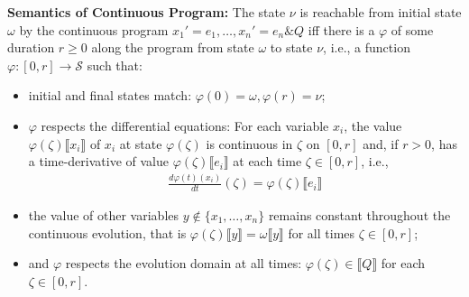 \textbf{Semantics of Continuous Program:}
The state $\nu$ is reachable from initial state $\omega$ 
by the continuous program $x_1' = e_1, \dots, x_n' = e_n \& Q$
iff there is a  $\varphi$ of some duration $r \geq 0$
along the program from state $\omega$ to state $\nu$, i.e., 
a function $\varphi:[0, r] \rightarrow \mathscr{S}$ such that:
\vspace{-.5cm}
\begin{itemize}
  \item initial and final states match: $\varphi(0) = \omega, \varphi(r) = \nu$;
  \item $\varphi$ respects the differential equations: For each variable $x_i$, 
    the value $\varphi(\zeta)\llbracket x_i \rrbracket$ of $x_i$ at 
    state $\varphi(\zeta)$ is continuous in $\zeta$ on $[0, r]$ and,
    if $r > 0$, has a time-derivative of value 
    $\varphi(\zeta)\llbracket e_i \rrbracket$ at each time $\zeta \in [0, r]$, 
    i.e.,
    \begin{align*}
      \frac{d\varphi(t)(x_i)}{dt}(\zeta) = \varphi(\zeta)\llbracket e_i \rrbracket
    \end{align*}
  \item the value of other variables $y \notin \{x_1, \dots, x_n\}$ remains 
    constant throughout the continuous evolution, that is 
    $\varphi(\zeta)\llbracket y \rrbracket = \omega\llbracket y \rrbracket$ 
    for all times $\zeta \in [0, r]$;
  \item and $\varphi$ respects the evolution domain at all times: 
    $\varphi(\zeta) \in \llbracket Q \rrbracket$ for each $\zeta \in [0, r]$.
\end{itemize}

\crule